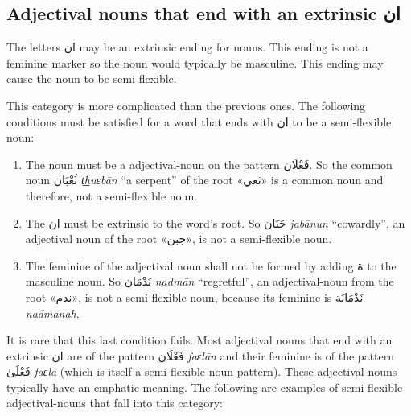 \documentclass[
  10pt,
]{book}
\providecommand{\tightlist}{%
  \setlength{\itemsep}{0pt}\setlength{\parskip}{0pt}}
\begin{document}
\subsection{\texorpdfstring{Adjectival nouns that end with an extrinsic \foreignlanguage{arabic}{ان}}{Adjectival nouns that end with an extrinsic ان}}\label{adjectival-noun-an-diptote}

The letters \foreignlanguage{arabic}{ان} may be an extrinsic ending for nouns. This ending is not a feminine marker so the noun would typically be masculine. This ending may cause the noun to be semi-flexible.

This category is more complicated than the previous ones. The following conditions must be satisfied for a word that ends with \foreignlanguage{arabic}{ان} to be a semi-flexible noun:

\begin{enumerate}
\def\labelenumi{\arabic{enumi}.}
\tightlist
\item
  The noun must be a adjectival-noun on the pattern \foreignlanguage{arabic}{فَعْلَان}. So the common noun \foreignlanguage{arabic}{ثُعْبَان} \emph{t͟huɛbān} \enquote{a serpent} of the root \foreignlanguage{arabic}{«ثعي»} is a common noun and therefore, not a semi-flexible noun.
\item
  The \foreignlanguage{arabic}{ان} must be extrinsic to the word's root. So \foreignlanguage{arabic}{جَبَان} \emph{jabānun} \enquote{cowardly}, an adjectival noun of the root \foreignlanguage{arabic}{«جبن»}, is not a semi-flexible noun.
\item
  The feminine of the adjectival noun shall not be formed by adding \foreignlanguage{arabic}{ة} to the masculine noun. So \foreignlanguage{arabic}{نَدْمَان} \emph{nadmān} \enquote{regretful}, an adjectival-noun from the root \foreignlanguage{arabic}{«ندم»}, is not a semi-flexible noun, because its feminine is \foreignlanguage{arabic}{نَدْمَانَة} \emph{nadmānah}.
\end{enumerate}

It is rare that this last condition fails. Most adjectival nouns that end with an extrinsic \foreignlanguage{arabic}{ان} are of the pattern \foreignlanguage{arabic}{فَعْلَان} \emph{faɛlān} and their feminine is of the pattern \foreignlanguage{arabic}{فَعْلَىٰ} \emph{faɛlā} (which is itself a semi-flexible noun pattern). These adjectival-nouns typically have an emphatic meaning. The following are examples of semi-flexible adjectival-nouns that fall into this category:
\end{document}
